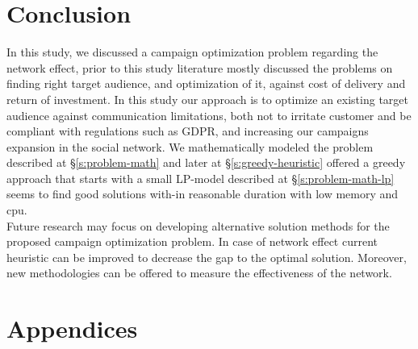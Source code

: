 \documentclass[11pt]{article}
\begin{document}

\newpage

\section{Conclusion} \label{s:conclusion}
In this study, we discussed a campaign optimization problem regarding the network effect, prior to this study literature mostly discussed the problems on finding right target audience, and optimization of it, against cost of delivery and return of investment. In this study our approach is to optimize an existing target audience against communication limitations, both not to irritate customer and be compliant with regulations such as GDPR, and increasing our campaigns expansion in the social network. We mathematically modeled the problem described at \S \ref{s:problem-math} and later at \S \ref{s:greedy-heuristic} offered a greedy approach that starts with a small LP-model described at \S \ref{s:problem-math-lp} seems to find good solutions with-in reasonable duration with low memory and cpu.\\
Future research may focus on developing alternative solution methods for the proposed campaign optimization problem. In case of network effect current heuristic can be improved to decrease the gap to the optimal solution. Moreover, new methodologies can be offered to measure the effectiveness of the network.

\newpage

\appendix
\section{Appendices}
\end{document}
